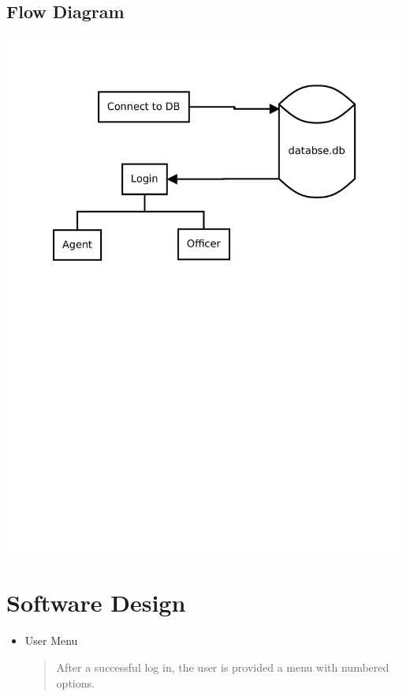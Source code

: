 \documentclass[10pt, a4paper]{article}
\begin{document}
{\subsection{Flow Diagram}
\begin{center}

\includegraphics[width=\textwidth]{Diagram1.pdf}
\end{center}

\newpage
\section{Software Design}\label{SD}
\begin{itemize}

\item User Menu
	\begin{quotation}
	\noindent After a successful log in, the user is provided a menu with numbered options. 
	\end{quotation}


\end{itemize}}
\end{document}
